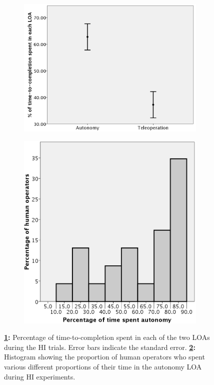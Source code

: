 \documentclass[a4paper,12pt,oneside,openright]{bhamthesis}
\begin{document}
\begin{figure}
		\centering
		\begin{subfigure}[b]{0.5\textwidth}
			\centering
			\includegraphics[width=\textwidth]{chapter4_fig/time-in-mode.png}
			\caption{}
			\label{subfig:time-percentage-mode_exp2}
		\end{subfigure}
		\hfill
		\begin{subfigure}[b]{0.45\textwidth}
			\centering
			\includegraphics[width=\textwidth]{chapter4_fig/time-mode-histogram.png}
			\caption{}
			\label{subfig:time-percentage-histogram_exp2}
		\end{subfigure}
		\hfill
		\caption{\textbf{\ref{subfig:time-percentage-mode_exp2}:} Percentage of time-to-completion spent in each of the two LOAs during the HI trials. Error bars indicate the standard error. \textbf{\ref{subfig:time-percentage-histogram_exp2}:} Histogram showing the proportion of human operators who spent various different proportions of their time in the autonomy LOA during HI experiments.}
		\label{fig:time-percentage_exp2}
\end{figure}
\end{document}
